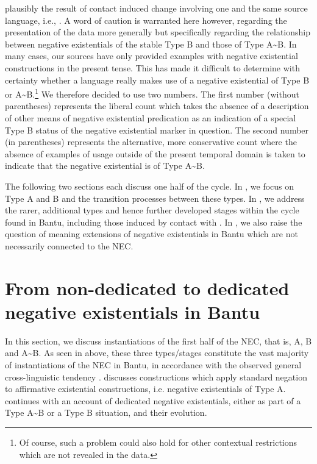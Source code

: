 \documentclass[output=paper]{langscibook}
\begin{document}
plausibly the result of contact induced change involving one and the same
source language, i.e., . A word of caution is warranted here
however, regarding the presentation of the data more generally but
specifically regarding the relationship between negative existentials of
the stable Type B and those of Type A{\textasciitilde}B. In many cases, our
sources have only provided examples with negative existential constructions
in the present tense. This has made it difficult to determine with
certainty whether a language really makes use of a negative existential of
Type B or A{\textasciitilde}B.\footnote{Of course, such a problem could
also hold for other contextual restrictions which are not revealed in the
data.} We therefore decided to use two numbers. The first number (without
parentheses) represents the liberal count which takes the absence of a
description of other means of negative existential predication as an
indication of a special Type B status of the negative existential marker in
question. The second number (in parentheses) represents the alternative,
more conservative count where the absence of examples of usage outside of
the present temporal domain is taken to indicate that the negative
existential is of Type A{\textasciitilde}B.

The following two sections each discuss one half of the cycle. In
, we focus on Type A and B and the transition processes
between these types. In , we address the rarer, additional
types and hence further developed stages within the cycle found in Bantu,
including those induced by contact with . In , we also raise the question of meaning extensions of negative existentials in Bantu which are not necessarily connected to the NEC.

\section{From non-dedicated to dedicated negative existentials in Bantu}\label{sec:1:5}
In this section, we discuss instantiations of the first half of the NEC,
that is, A, B and A{\textasciitilde}B. As seen in 
above, these three types/stages constitute the vast majority of
instantiations of the NEC in Bantu, in accordance with the observed general
cross-linguistic tendency \citep{Veselinova2016,Croft1991}.
 discusses constructions which apply standard negation
to affirmative existential constructions, i.e. negative existentials of
Type A.  continues with an account of dedicated negative
existentials, either as part of a Type A{\textasciitilde}B or a Type B
situation, and their evolution.
\end{document}
